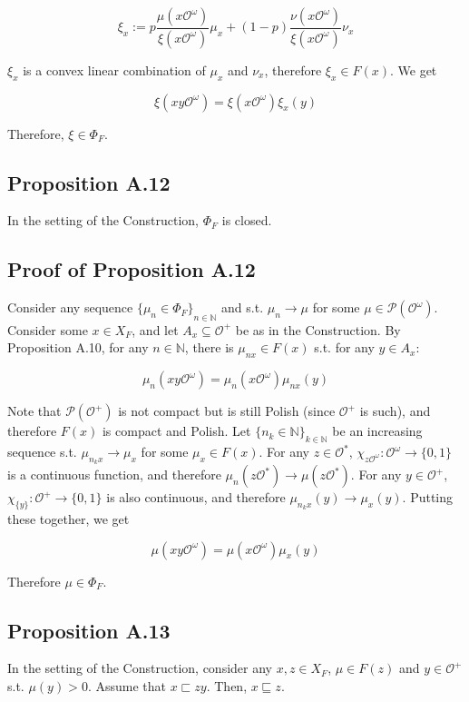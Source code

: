 \documentclass[a4paper]{article}
\newcommand{\Nats}{\mathbb{N}}
\newcommand{\Prob}{\mathcal{P}}
\newcommand{\Obs}{\mathcal{O}}
\newcommand{\ObsO}{\Obs^\omega}
\begin{document}
$$\xi_x := p\frac{\mu(x\ObsO)}{\xi(x\ObsO)}\mu_x+(1-p)\frac{\nu(x\ObsO)}{\xi(x\ObsO)}\nu_x$$

${\xi_x}$ is a convex linear combination of ${\mu_x}$ and ${\nu_x}$, therefore ${\xi_x \in F(x)}$. We get

$$\xi(xy\ObsO) = \xi(x\ObsO) \xi_x(y)$$

Therefore, ${\xi \in \Phi_F}$.

\subsection{Proposition A.12}

In the setting of the Construction, ${\Phi_F}$ is closed.

\subsection{Proof of Proposition A.12}

Consider any sequence ${\{\mu_n \in \Phi_F\}}_{n \in \Nats}$ and s.t. ${\mu_n \rightarrow \mu}$ for some ${\mu \in \Prob(\ObsO)}$. Consider some ${x \in X_F}$, and let ${A_x \subseteq \Obs^+}$ be as in the Construction. By Proposition A.10, for any ${n \in \Nats}$, there is ${\mu_{nx} \in F(x)}$ s.t. for any ${y \in A_x}$:

$$\mu_n(xy\ObsO) = \mu_n(x\ObsO) \mu_{nx}(y)$$

Note that ${\Prob(\Obs^+)}$ is not compact but is still Polish (since ${\Obs^+}$ is such), and therefore ${F(x)}$ is compact and Polish. Let ${\{n_k \in \Nats\}_{k \in \Nats}}$ be an increasing sequence s.t. ${\mu_{n_kx} \rightarrow \mu_x}$ for some ${\mu_x \in F(x)}$. For any ${z \in \Obs^*}$, ${\chi_{z\ObsO}: \ObsO \rightarrow \{0,1\}}$ is a continuous function, and therefore ${\mu_{n}(z\Obs^*) \rightarrow \mu(z\Obs^*)}$. For any ${y \in \Obs^+}$, ${\chi_{\{y\}}: \Obs^+ \rightarrow \{0,1\}}$ is also continuous, and therefore ${\mu_{n_k x}(y) \rightarrow \mu_x(y)}$. Putting these together, we get

$$\mu(xy\ObsO) = \mu(x\ObsO) \mu_{x}(y)$$

Therefore ${\mu \in \Phi_F}$.

\subsection{Proposition A.13}

In the setting of the Construction, consider any ${x,z \in X_F}$, ${\mu \in F(z)}$ and ${y \in \Obs^+}$ s.t. ${\mu(y) > 0}$. Assume that ${x \sqsubset zy}$. Then, ${x \sqsubseteq z}$.
\end{document}

